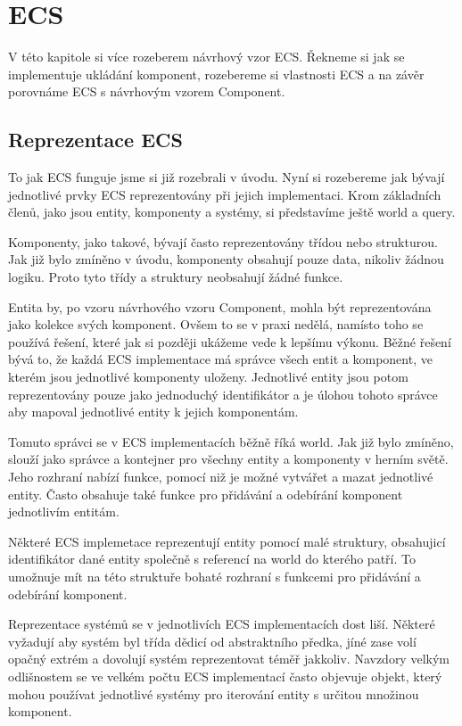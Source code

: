 \chapter{ECS}
\label{chap:ecs}
V této kapitole si více rozeberem návrhový vzor ECS. Řekneme si jak se implementuje ukládání komponent, rozebereme si vlastnosti ECS a na závěr porovnáme ECS s návrhovým vzorem Component.

\section{Reprezentace ECS}
To jak ECS funguje jsme si již rozebrali v úvodu. Nyní si rozebereme jak bývají jednotlivé prvky ECS reprezentovány při jejich implementaci. Krom základních členů, jako jsou entity, komponenty a systémy, si představíme ještě world a query.

Komponenty, jako takové, bývají často reprezentovány třídou nebo strukturou. Jak již bylo zmíněno v úvodu, komponenty obsahují pouze data, nikoliv žádnou logiku. Proto tyto třídy a struktury neobsahují žádné funkce.

Entita by, po vzoru návrhového vzoru Component, mohla být reprezentována jako kolekce svých komponent. Ovšem to se v praxi nedělá, namísto toho se používá řešení, které jak si později ukážeme vede k lepšímu výkonu. Běžné řešení bývá to, že každá ECS implementace má správce všech entit a komponent, ve kterém jsou jednotlivé komponenty uloženy. Jednotlivé entity jsou potom reprezentovány pouze jako jednoduchý identifikátor a je úlohou tohoto správce aby mapoval jednotlivé entity k jejich komponentám.

Tomuto správci se v ECS implementacích běžně říká world. Jak již bylo zmíněno, slouží jako správce a kontejner pro všechny entity a komponenty v herním světě. Jeho rozhraní nabízí funkce, pomocí niž je možné vytvářet a mazat jednotlivé entity. Často obsahuje také funkce pro přidávání a odebírání komponent jednotlivím entitám.

Některé ECS implemetace reprezentují entity pomocí malé struktury, obsahujicí identifikátor dané entity společně s referencí na world do kterého patří. To umožnuje mít na této struktuře bohaté rozhraní s funkcemi pro přidávání a odebírání komponent.

Reprezentace systémů se v jednotlivích ECS implementacích dost liší. Některé vyžadují aby systém byl třída dědicí od abstraktního předka, jíné zase volí opačný extrém a dovolují systém reprezentovat téměř jakkoliv. Navzdory velkým odlišnostem se ve velkém počtu ECS implementací často objevuje objekt, který mohou používat jednotlivé systémy pro iterování entity s určitou množinou komponent.

